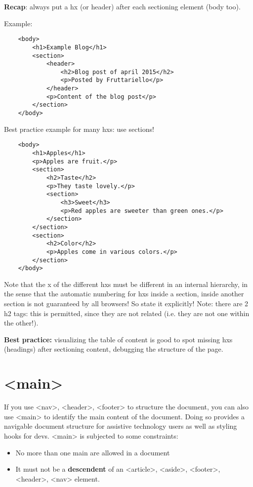 \documentclass[a4paper,11pt]{book}
\begin{document}
    \textbf{Recap}: always put a hx (or header) after each sectioning element (body too).

    Example:
    \begin{verbatim}
    <body>
        <h1>Example Blog</h1>
        <section>
            <header>
                <h2>Blog post of april 2015</h2>
                <p>Posted by Fruttariello</p>
            </header>
            <p>Content of the blog post</p>
        </section>
    </body>
    \end{verbatim}

    Best practice example for many hxs: use sections!
    \begin{verbatim}
    <body>
        <h1>Apples</h1>
        <p>Apples are fruit.</p>
        <section>
            <h2>Taste</h2>
            <p>They taste lovely.</p>
            <section>
                <h3>Sweet</h3>
                <p>Red apples are sweeter than green ones.</p>
            </section>
        </section>
        <section>
            <h2>Color</h2>
            <p>Apples come in various colors.</p>
        </section>
    </body>
    \end{verbatim}

    Note that the x of the different hxs must be different in an internal hierarchy,
    in the sense that the automatic numbering for hxs inside a section, inside another
    section is not guaranteed by all browsers! So state it explicitly!
    Note: there are 2 h2 tags: this is permitted, since they are not related (i.e.
    they are not one within the other!).

    \textbf{Best practice:} visualizing the table of content is good to spot missing hxs (headings)
    after sectioning content, debugging the structure of the page.

    \section{<main>}
    If you use <nav>, <header>, <footer> to structure the document, you can also use <main> to
    identify the main content of the document. Doing so provides a navigable document structure
    for assistive technology users as well as styling hooks for devs.
    <main> is subjected to some constraints:
    \begin{itemize}
        \item No more than one main are allowed in a document
        \item It must not be a \textbf{descendent} of an <article>, <aside>, <footer>, <header>, <nav> element.
    \end{itemize}
    
\end{document}
